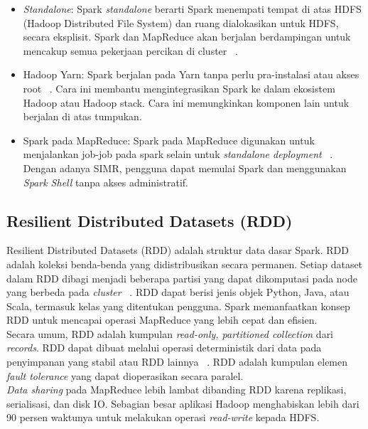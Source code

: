 \begin{itemize}

\item \textit{Standalone}: Spark \textit{standalone} berarti Spark menempati tempat di atas HDFS (Hadoop Distributed File System) dan ruang dialokasikan untuk HDFS, secara eksplisit. Spark dan MapReduce akan berjalan berdampingan untuk mencakup semua pekerjaan percikan di cluster ~\cite{holdenkarau:07:ls}.

\item Hadoop Yarn: Spark berjalan pada Yarn tanpa perlu pra-instalasi atau akses root ~\cite{holdenkarau:07:ls}. Cara ini membantu mengintegrasikan Spark ke dalam ekosistem Hadoop atau Hadoop stack. Cara ini memungkinkan komponen lain untuk berjalan di atas tumpukan.

\item Spark pada MapReduce: Spark pada MapReduce digunakan untuk menjalankan job-job pada spark selain untuk \textit{standalone deployment} ~\cite{holdenkarau:07:ls}. Dengan adanya SIMR, pengguna dapat memulai Spark dan menggunakan \textit{Spark Shell} tanpa akses administratif.\\

\end{itemize}

\subsection{Resilient Distributed Datasets (RDD)}

Resilient Distributed Datasets (RDD) adalah struktur data dasar Spark. RDD adalah koleksi benda-benda yang didistribusikan secara permanen. Setiap dataset dalam RDD dibagi menjadi beberapa partisi yang dapat dikomputasi pada node yang berbeda pada \textit{cluster} ~\cite{holdenkarau:07:ls}. RDD dapat berisi jenis objek Python, Java, atau Scala, termasuk kelas yang ditentukan pengguna. Spark memanfaatkan konsep RDD untuk mencapai operasi MapReduce yang lebih cepat dan efisien. ~\cite{holdenkarau:07:ls}\\

Secara umum, RDD adalah kumpulan \textit{read-only, partitioned collection} dari \textit{records}. RDD dapat dibuat melalui operasi deterministik dari data pada penyimpanan yang stabil atau RDD lainnya ~\cite{holdenkarau:07:ls}. RDD adalah kumpulan elemen \textit{fault tolerance} yang dapat dioperasikan secara paralel.\\


\textit{Data sharing} pada MapReduce lebih lambat dibanding RDD  karena replikasi, serialisasi, dan disk IO. Sebagian besar aplikasi Hadoop menghabiskan lebih dari 90 persen waktunya untuk melakukan operasi \textit{read-write} kepada HDFS.\\

